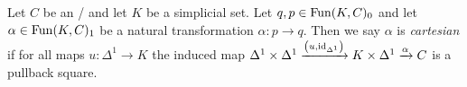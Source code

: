 \begin{definition}
    Let $C$ be an \inftycat/ and let $K$ be a simplicial set.
    Let $q,p\in\operatorname{Fun}(K,C)_0$ and let $\alpha\in\operatorname{Fun}(K,C)_1$ be a natural transformation $\alpha\colon p\to q$.
    Then we say $\alpha$ is \emph{cartesian} if for all maps $u\colon\Delta^1\to K$ the induced map $\Delta^1\times\Delta^1\xrightarrow{\left(u,\text{id}_{\Delta^1}\right)}K\times\Delta^1\xrightarrow{\alpha}C$ is a pullback square.
\end{definition}
    
    
